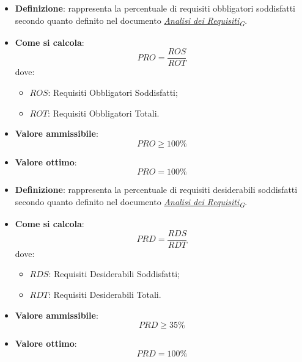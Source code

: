 \begin{itemize}
	\item \textbf{Definizione}: rappresenta la percentuale di requisiti obbligatori soddisfatti secondo quanto definito nel documento \href{https://7last.github.io/docs/rtb/documentazione-interna/glossario\#analisi-dei-requisiti}{\textit{Analisi dei Requisiti\textsubscript{G}}}.
	\item \textbf{Come si calcola}: \begin{equation*}PRO = \frac{ROS}{ROT}\end{equation*} dove:
		\begin{itemize}
			\item $ROS$: Requisiti Obbligatori Soddisfatti;
			\item $ROT$: Requisiti Obbligatori Totali.
		\end{itemize}
	\item \textbf{Valore ammissibile}: \begin{equation*}PRO \geq 100\%\end{equation*}
	\item \textbf{Valore ottimo}: \begin{equation*}PRO = 100\%\end{equation*}
\end{itemize}

\begin{itemize}
	\item \textbf{Definizione}: rappresenta la percentuale di requisiti desiderabili soddisfatti secondo quanto definito nel documento \href{https://7last.github.io/docs/rtb/documentazione-interna/glossario\#analisi-dei-requisiti}{\textit{Analisi dei Requisiti\textsubscript{G}}}.
	\item \textbf{Come si calcola}: \begin{equation*}PRD = \frac{RDS}{RDT}\end{equation*} dove:
		\begin{itemize}
			\item $RDS$: Requisiti Desiderabili Soddisfatti;
			\item $RDT$: Requisiti Desiderabili Totali.
		\end{itemize}
	\item \textbf{Valore ammissibile}: \begin{equation*}PRD \geq 35\%\end{equation*}
	\item \textbf{Valore ottimo}: \begin{equation*}PRD = 100\%\end{equation*}
\end{itemize}

